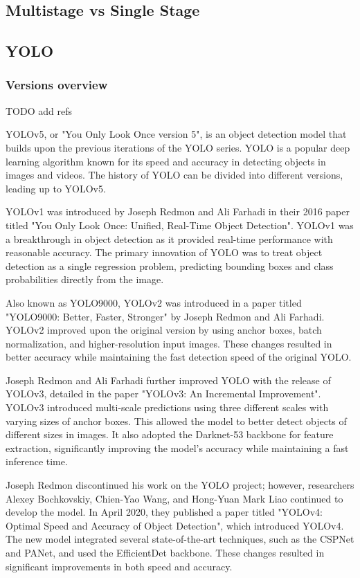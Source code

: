 \documentclass[14pt,a4paper]{extarticle}
\newcounter{e}
\numberwithin{equation}{section}
\numberwithin{figure}{section}
\begin{document}
\subsection{Multistage vs Single Stage}
\subsection{YOLO}
\subsubsection{Versions overview}
TODO add refs
        
YOLOv5, or "You Only Look Once version 5", is an object detection model that builds upon the previous iterations of the YOLO series. YOLO is a popular deep learning algorithm known for its speed and accuracy in detecting objects in images and videos. The history of YOLO can be divided into different versions, leading up to YOLOv5.

YOLOv1 was introduced by Joseph Redmon and Ali Farhadi in their 2016 paper titled "You Only Look Once: Unified, Real-Time Object Detection". YOLOv1 was a breakthrough in object detection as it provided real-time performance with reasonable accuracy. The primary innovation of YOLO was to treat object detection as a single regression problem, predicting bounding boxes and class probabilities directly from the image.

Also known as YOLO9000, YOLOv2 was introduced in a paper titled "YOLO9000: Better, Faster, Stronger" by Joseph Redmon and Ali Farhadi. YOLOv2 improved upon the original version by using anchor boxes, batch normalization, and higher-resolution input images. These changes resulted in better accuracy while maintaining the fast detection speed of the original YOLO.

Joseph Redmon and Ali Farhadi further improved YOLO with the release of YOLOv3, detailed in the paper "YOLOv3: An Incremental Improvement". YOLOv3 introduced multi-scale predictions using three different scales with varying sizes of anchor boxes. This allowed the model to better detect objects of different sizes in images. It also adopted the Darknet-53 backbone for feature extraction, significantly improving the model's accuracy while maintaining a fast inference time.

Joseph Redmon discontinued his work on the YOLO project; however, researchers Alexey Bochkovskiy, Chien-Yao Wang, and Hong-Yuan Mark Liao continued to develop the model. In April 2020, they published a paper titled "YOLOv4: Optimal Speed and Accuracy of Object Detection", which introduced YOLOv4. The new model integrated several state-of-the-art techniques, such as the CSPNet and PANet, and used the EfficientDet backbone. These changes resulted in significant improvements in both speed and accuracy.
\end{document}
